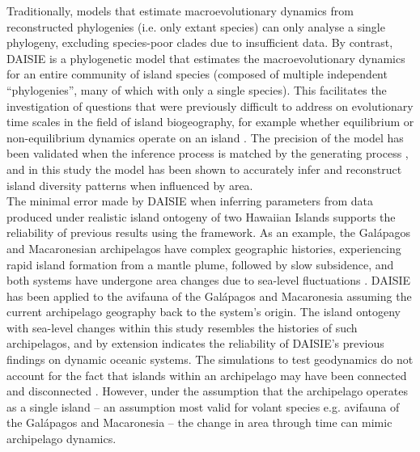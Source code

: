 \documentclass{article}
\begin{document}
Traditionally, models that estimate macroevolutionary dynamics from reconstructed phylogenies (i.e. only extant species) can only analyse a single phylogeny, excluding species-poor clades due to insufficient data. By contrast, DAISIE is a phylogenetic model that estimates the macroevolutionary dynamics for an entire community of island species (composed of multiple independent “phylogenies”, many of which with only a single species). This facilitates the investigation of questions that were previously difficult to address on evolutionary time scales in the field of island biogeography, for example whether equilibrium or non-equilibrium dynamics operate on an island \citep{valente_equilibrium_2015}. The precision of the model has been validated when the inference process is matched by the generating process \citep{valente_equilibrium_2015, valente_recent_2017, valente_using_2018}, and in this study the model has been shown to accurately infer and reconstruct island diversity patterns when influenced by area. \\

The minimal error made by DAISIE when inferring parameters from data produced under realistic island ontogeny of two Hawaiian Islands supports the reliability of previous results using the framework. As an example, the Gal\'{a}pagos and Macaronesian archipelagos have complex geographic histories, experiencing rapid island formation from a mantle plume, followed by slow subsidence, and both systems have undergone area changes due to sea-level fluctuations \citep{fernandez-palacios_reconstruction_2011, ali_exploring_2014, geist_2014_paleogeographic, rijsdijk_quantifying_2014}. DAISIE has been applied to the avifauna of the Gal\'{a}pagos and Macaronesia assuming the current archipelago geography back to the system’s origin. The island ontogeny with sea-level changes within this study resembles the histories of such archipelagos, and by extension indicates the reliability of DAISIE’s previous findings on dynamic oceanic systems. The simulations to test geodynamics do not account for the fact that islands within an archipelago may have been connected and disconnected \citep{aguilee_biogeographic_2021}. However, under the assumption that the archipelago operates as a single island – an assumption most valid for volant species e.g. avifauna of the Gal\'{a}pagos \citep{valente_equilibrium_2015} and Macaronesia \citep{valente_equilibrium_2017} – the change in area through time can mimic archipelago dynamics. \\
\end{document}
